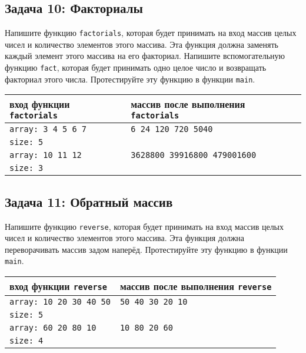 \documentclass{article}
\begin{document}
\subsection*{Задача 10: Факториалы}
Напишите функцию \texttt{factorials}, которая будет принимать на вход массив целых чисел и количество элементов этого массива. Эта функция должна заменять каждый элемент этого массива на его факториал. Напишите вспомогательную функцию \texttt{fact}, которая будет принимать одно целое число и возвращать факториал этого числа. Протестируйте эту функцию в функции \texttt{main}.
\begin{center}
\begin{tabular}{ l | l }
 вход функции \texttt{factorials} & массив после выполнения \texttt{factorials} \\ \hline
 \texttt{array: 3 4 5 6 7} & \texttt{6 24 120 720 5040} \\
 \texttt{size: 5} & \\ \hline
 \texttt{array: 10 11 12} & \texttt{3628800 39916800 479001600} \\
 \texttt{size: 3} & \\
\end{tabular}
\end{center} 


\subsection*{Задача 11: Обратный массив}
Напишите функцию \texttt{reverse}, которая будет принимать на вход массив целых чисел и количество элементов этого массива. Эта функция должна переворачивать массив задом наперёд. Протестируйте эту функцию в функции \texttt{main}.
\begin{center}
\begin{tabular}{ l | l }
 вход функции \texttt{reverse} & массив после выполнения \texttt{reverse} \\ \hline
 \texttt{array: 10 20 30 40 50} & \texttt{50 40 30 20 10} \\
 \texttt{size: 5} & \\ \hline
 \texttt{array: 60 20 80 10} & \texttt{10 80 20 60} \\
 \texttt{size: 4} & \\
\end{tabular}
\end{center} 
\end{document}
